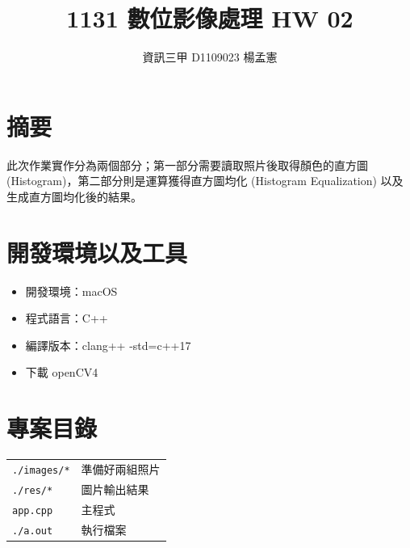 \documentclass[12pt,a4paper]{article}
\begin{document}
\title{1131 數位影像處理 HW 02}
\author{資訊三甲 \quad D1109023 \quad 楊孟憲}
\date{}
\maketitle

\section*{摘要}
此次作業實作分為兩個部分；第一部分需要讀取照片後取得顏色的直方圖(Histogram)，第二部分則是運算獲得直方圖均化 (Histogram Equalization) 以及生成直方圖均化後的結果。


\section{開發環境以及工具}
    \begin{itemize}
        \item 開發環境：macOS
        \item 程式語言：C++
        \item 編譯版本：clang++ -std=c++17
        \item 下載 openCV4
    \end{itemize}

\section{專案目錄}
\begin{minipage}{\textwidth} 
    \begin{tabular}{ll}
        \texttt{./images/*} & 準備好兩組照片 \\
        \texttt{./res/*} & 圖片輸出結果 \\
        \texttt{app.cpp} & 主程式 \\
        \texttt{./a.out} & 執行檔案 \\
    \end{tabular}
\end{minipage}


\end{document}
